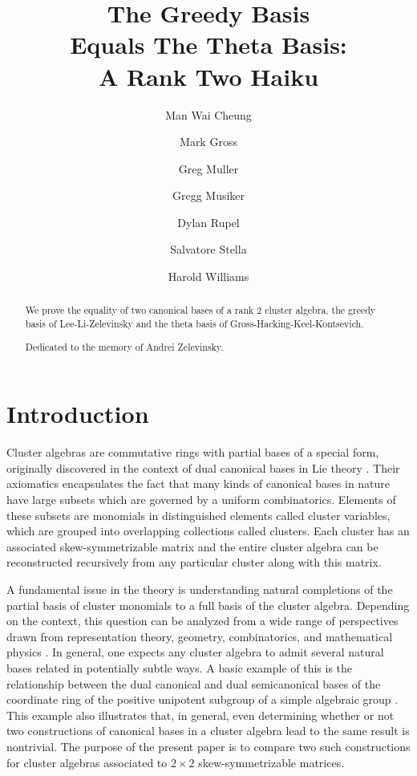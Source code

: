 \documentclass[11pt]{amsart}
\title[The Greedy Basis equals the Theta Basis]{The Greedy Basis \\ Equals The Theta Basis: \\ A Rank Two Haiku}
\author[Cheung]{Man Wai Cheung}
\author[Gross]{Mark Gross}
\author[Muller]{Greg Muller}
\author[Musiker]{Gregg Musiker}
\author[Rupel]{Dylan Rupel}
\author[Stella]{Salvatore Stella}
\author[Williams]{Harold Williams}
\theoremstyle{remark}
\numberwithin{equation}{section}
\begin{document}
\begin{abstract}
We prove the equality of two canonical bases of a rank 2 cluster algebra, the greedy basis of Lee-Li-Zelevinsky and the theta basis of Gross-Hacking-Keel-Kontsevich.

\bigskip

\begin{center}
{Dedicated to the memory of Andrei Zelevinsky.}
\end{center}

\end{abstract}


\maketitle

\section{Introduction}

Cluster algebras are commutative rings with partial bases of a special form, originally discovered in the context of dual canonical bases in Lie theory \cite{FZ}.  Their axiomatics encapsulates the fact that many kinds of canonical bases in nature have large subsets which are governed by a uniform combinatorics.  Elements of these subsets are monomials in distinguished elements called cluster variables, which are grouped into overlapping collections called clusters.  Each cluster has an associated skew-symmetrizable matrix and the entire cluster algebra can be reconstructed recursively from any particular cluster along with this matrix.

A fundamental issue in the theory is understanding natural completions of the partial basis of cluster monomials to a full basis of the cluster algebra.  Depending on the context, this question can be analyzed from a wide range of perspectives drawn from representation theory, geometry, combinatorics, and mathematical physics \cite{Dup,KQ,FG,MSW,BZ,Rup2,GMN}.  In general, one expects any cluster algebra to admit several natural bases related in potentially subtle ways.  A basic example of this is the relationship between the dual canonical and dual semicanonical bases of the coordinate ring of the positive unipotent subgroup of a simple algebraic group \cite{GLS}.  This example also illustrates that, in general, even determining whether or not two constructions of canonical bases in a cluster algebra lead to the same result is nontrivial.  The purpose of the present paper is to compare two such constructions for cluster algebras associated to $2\times2$ skew-symmetrizable matrices. 
\end{document}

